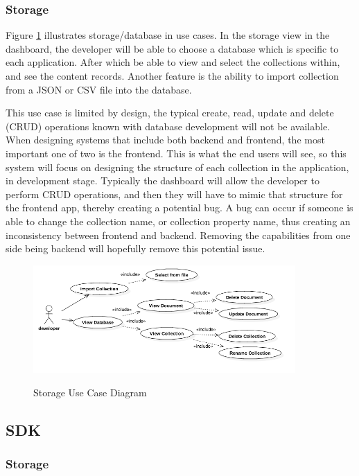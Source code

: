 \subsubsection{Storage}

Figure \ref{fig:storage_use_case} illustrates storage/database in use cases. In the storage view in the dashboard, the developer will be able to choose a database which is specific to each application. After which be able to view and select the collections within, and see the content records. Another feature is the ability to import collection from a JSON or CSV file into the database.

This use case is limited by design, the typical create, read, update and delete (CRUD) operations known with database development will not be available. When designing systems that include both backend and frontend, the most important one of two is the frontend. This is what the end users will see, so this system will focus on designing the structure of each collection in the application, in development stage. Typically the dashboard will allow the developer to perform CRUD operations, and then they will have to mimic that structure for the frontend app, thereby creating a potential bug. A bug can occur if someone is able to change the collection name, or collection property name, thus creating an inconsistency between frontend and backend. Removing the capabilities from one side being backend will hopefully remove this potential issue. 

\begin{figure}[!h]
    \caption{Storage Use Case Diagram}
    \centering
    \includegraphics[width=100mm]{images/use_cases/storage_use_case}
    \label{fig:storage_use_case}
\end{figure}

\subsection{SDK}

\subsubsection{Storage}

